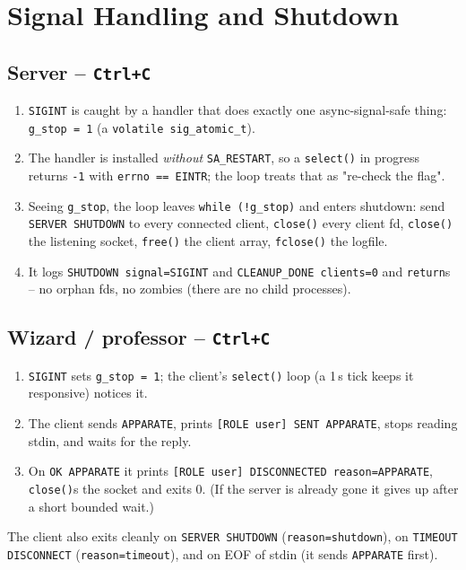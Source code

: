 \documentclass[11pt,a4paper]{article}
\begin{document}
\section{Signal Handling and Shutdown}

\subsection{Server -- \texttt{Ctrl+C}}
\begin{enumerate}[nosep]
  \item \texttt{SIGINT} is caught by a handler that does exactly one
        async-signal-safe thing: \texttt{g\_stop = 1} (a
        \texttt{volatile sig\_atomic\_t}).
  \item The handler is installed \emph{without} \texttt{SA\_RESTART}, so a
        \texttt{select()} in progress returns \texttt{-1} with \texttt{errno ==
        EINTR}; the loop treats that as "re-check the flag".
  \item Seeing \texttt{g\_stop}, the loop leaves \texttt{while (!g\_stop)} and
        enters shutdown: send \texttt{SERVER SHUTDOWN} to every connected client,
        \texttt{close()} every client fd, \texttt{close()} the listening socket,
        \texttt{free()} the client array, \texttt{fclose()} the logfile.
  \item It logs \texttt{SHUTDOWN signal=SIGINT} and \texttt{CLEANUP\_DONE
        clients=0} and \texttt{return}s -- no orphan fds, no zombies (there are no
        child processes).
\end{enumerate}

\subsection{Wizard / professor -- \texttt{Ctrl+C}}
\begin{enumerate}[nosep]
  \item \texttt{SIGINT} sets \texttt{g\_stop = 1}; the client's \texttt{select()}
        loop (a 1\,s tick keeps it responsive) notices it.
  \item The client sends \texttt{APPARATE}, prints
        \texttt{[ROLE user] SENT APPARATE}, stops reading stdin, and waits for the
        reply.
  \item On \texttt{OK APPARATE} it prints \texttt{[ROLE user] DISCONNECTED
        reason=APPARATE}, \texttt{close()}s the socket and exits 0. (If the
        server is already gone it gives up after a short bounded wait.)
\end{enumerate}
The client also exits cleanly on \texttt{SERVER SHUTDOWN}
(\texttt{reason=shutdown}), on \texttt{TIMEOUT DISCONNECT}
(\texttt{reason=timeout}), and on EOF of stdin (it sends \texttt{APPARATE} first).
\end{document}
